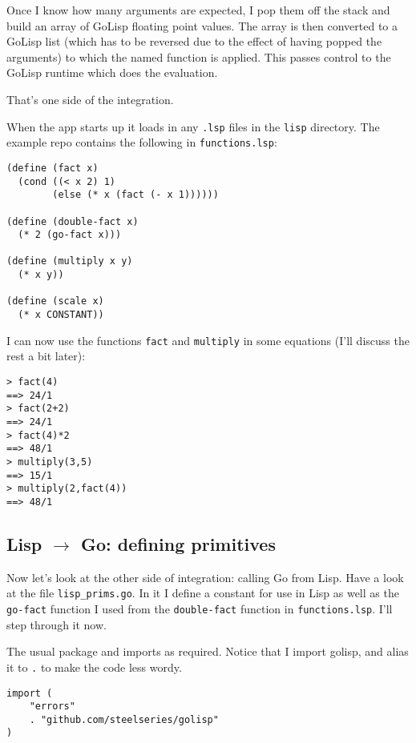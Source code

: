 \documentclass{scrartcl}
\begin{document}
Once I know how many arguments are expected, I pop them off the stack
and build an array of GoLisp floating point values. The array is then
converted to a GoLisp list (which has to be reversed due to the effect
of having popped the arguments) to which the named function is
applied. This passes control to the GoLisp runtime which does the
evaluation.

That's one side of the integration.

When the app starts up it loads in any \texttt{.lsp} files in the \texttt{lisp}
directory. The example repo contains the following in \texttt{functions.lsp}:

\begin{verbatim}(define (fact x)
  (cond ((< x 2) 1)
        (else (* x (fact (- x 1))))))

(define (double-fact x)
  (* 2 (go-fact x)))

(define (multiply x y)
  (* x y))

(define (scale x)
  (* x CONSTANT))
\end{verbatim}

I can now use the functions \texttt{fact} and \texttt{multiply} in some equations
(I'll discuss the rest a bit later):

\begin{verbatim}> fact(4)
==> 24/1
> fact(2+2)
==> 24/1
> fact(4)*2
==> 48/1
> multiply(3,5)
==> 15/1
> multiply(2,fact(4))
==> 48/1
\end{verbatim}

\subsection{Lisp $\rightarrow${} Go: defining primitives}\hypertarget{lisp-rarr-go-defining-primitives}{}\label{lisp-rarr-go-defining-primitives}

Now let's look at the other side of integration: calling Go from Lisp.
Have a look at the file \texttt{lisp\_prims.go}. In it I define a constant for
use in Lisp as well as the \texttt{go-fact} function I used from
the \texttt{double-fact} function in \texttt{functions.lsp}. I'll step through it
now.

The usual package and imports as required. Notice that I import
golisp, and alias it to \texttt{.} to make the code less wordy.

\begin{verbatim}import (
    "errors"
    . "github.com/steelseries/golisp"
)
\end{verbatim}
\end{document}
